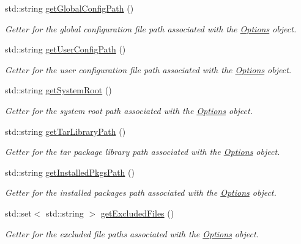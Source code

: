 \begin{DoxyCompactItemize}
std\+::string \mbox{\hyperlink{classOptions_a728f8f4b4a04eaca1cfb8693288b7812}{get\+Global\+Config\+Path}} ()
\begin{DoxyCompactList}\small\item\em Getter for the global configuration file path associated with the \mbox{\hyperlink{classOptions}{Options}} object. \end{DoxyCompactList}\item 
std\+::string \mbox{\hyperlink{classOptions_a2b06d8f1e5fad600abde17edc713f921}{get\+User\+Config\+Path}} ()
\begin{DoxyCompactList}\small\item\em Getter for the user configuration file path associated with the \mbox{\hyperlink{classOptions}{Options}} object. \end{DoxyCompactList}\item 
std\+::string \mbox{\hyperlink{classOptions_af9328ba8e2769b496e7866e2ca6594e0}{get\+System\+Root}} ()
\begin{DoxyCompactList}\small\item\em Getter for the system root path associated with the \mbox{\hyperlink{classOptions}{Options}} object. \end{DoxyCompactList}\item 
std\+::string \mbox{\hyperlink{classOptions_a378f5ced3e8499fd26cc2b113bcd7642}{get\+Tar\+Library\+Path}} ()
\begin{DoxyCompactList}\small\item\em Getter for the tar package library path associated with the \mbox{\hyperlink{classOptions}{Options}} object. \end{DoxyCompactList}\item 
std\+::string \mbox{\hyperlink{classOptions_a25d503327960948c9610586e7a74cad1}{get\+Installed\+Pkgs\+Path}} ()
\begin{DoxyCompactList}\small\item\em Getter for the installed packages path associated with the \mbox{\hyperlink{classOptions}{Options}} object. \end{DoxyCompactList}\item 
std\+::set$<$ std\+::string $>$ \mbox{\hyperlink{classOptions_ae5b813f7b6ea8d9e3315864957c77ae1}{get\+Excluded\+Files}} ()
\begin{DoxyCompactList}\small\item\em Getter for the excluded file paths associated with the \mbox{\hyperlink{classOptions}{Options}} object. \end{DoxyCompactList}\item 

\end{DoxyCompactItemize}
